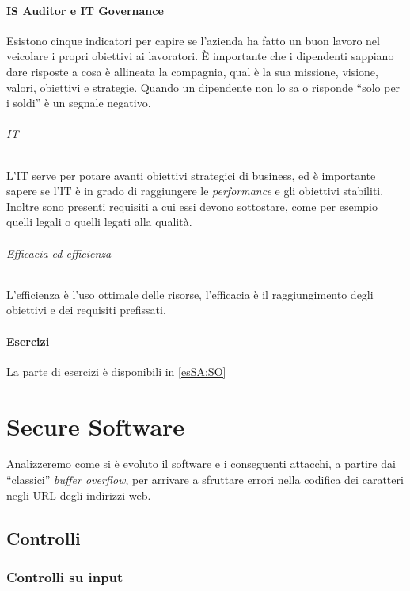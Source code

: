\subsection{IS Auditor e IT Governance}

Esistono cinque indicatori per capire se l'azienda ha fatto un buon lavoro nel 
veicolare i propri obiettivi ai lavoratori. È importante che i dipendenti 
sappiano dare risposte a cosa è allineata la compagnia, qual è la sua missione, 
visione, valori, obiettivi e strategie. Quando un dipendente non lo sa o 
risponde ``solo per i soldi'' è un segnale negativo.

\paragraph*{IT} L'IT serve per potare avanti obiettivi strategici di business, 
ed è importante sapere se l'IT è in grado di raggiungere le \textit{performance}
e gli obiettivi stabiliti. Inoltre sono presenti requisiti a cui essi devono 
sottostare, come per esempio quelli legali o quelli legati alla qualità.

\paragraph*{Efficacia ed efficienza} L'efficienza è l'uso ottimale delle 
risorse, l'efficacia è il raggiungimento degli obiettivi e dei requisiti 
prefissati.


\subsection{Esercizi}

La parte di esercizi è disponibili in \ref{esSA:SO}

\part{Secure Software}

Analizzeremo come si è evoluto il software e i conseguenti attacchi, a partire 
dai ``classici'' \textit{buffer overflow}, per arrivare a sfruttare errori
nella codifica dei caratteri negli URL degli indirizzi web.

\chapter{Controlli}
\label{Controlli}

\section{Controlli su input}

